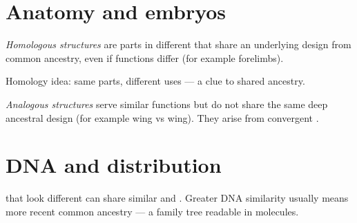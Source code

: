\section{Anatomy and embryos}

\begin{definition}\label{def:g8:evolution:homol}
\emph{Homologous structures} are  parts
in different  that share an underlying design from common ancestry,
even if functions differ (for example  forelimbs).
\end{definition}

\begin{omfigure}

{\small Homology idea: same parts, different uses --- a clue to shared
ancestry.}
\end{omfigure}

\begin{definition}\label{def:g8:evolution:anal}
\emph{Analogous structures} serve similar
functions but do not share the same deep ancestral design (for example
 wing vs  wing). They arise from convergent .
\end{definition}

\section{DNA and distribution}

\begin{proposition}\label{prop:g8:evolution:dna}
 that look different can share similar  and . Greater
DNA similarity usually means more recent common ancestry --- a family
tree readable in molecules.
\end{proposition}
\admitted


